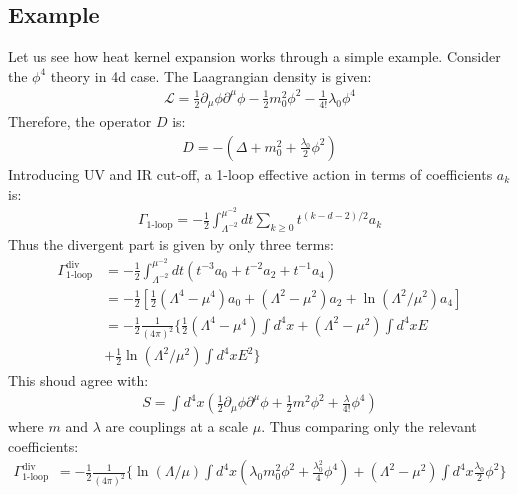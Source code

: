 \subsection{Example}
Let us see how heat kernel expansion works through a simple example. Consider the $\phi ^{4}$ theory in 4d case. The Laagrangian density is given:
\begin{align}
    \mathcal{L} = \frac{1}{2} \partial_{\mu} \phi \partial ^{\mu} \phi - \frac{1}{2}m_{0}^{2} \phi^{2} -\frac{1}{4!} \lambda _{0} \phi^4
\end{align}
Therefore, the operator $D$ is:
\begin{align}
    D = -(\Delta + m_{0}^{2} + \frac{\lambda_{0}}{2}\phi ^{2})
\end{align}
Introducing UV and IR cut-off, a 1-loop effective action in terms of coefficients $a_{k}$ is:
\begin{align}
    \Gamma _{\text{1-loop}} = -\frac{1}{2} \int _{\Lambda ^{-2}}^{\mu ^{-2}} dt \sum _{k\ge 0} t^{(k-d-2)/2}a_{k} 
\end{align}
Thus the divergent part is given by only three terms:
\begin{align}
    \Gamma_{\text{1-loop}}^{\text{div}} &= -\frac{1}{2}  \int _{\Lambda ^{-2}}^{\mu ^{-2}} dt (t^{-3} a_{0} + t^{-2} a_{2} + t^{-1} a_{4}) \nonumber \\
    & = -\frac{1}{2} [\frac{1}{2} (\Lambda ^{4} -\mu ^{4}) a_{0} + (\Lambda ^{2} - \mu ^{2}) a_{2} + \ln (\Lambda ^{2}/\mu ^{2}) a_{4}] \nonumber \\
    &= -\frac{1}{2} \frac{1}{(4\pi)^{2}} \lbrace \frac{1}{2} (\Lambda ^{4} - \mu ^{4}) \int d^{4}x + (\Lambda ^{2} - \mu ^{2}) \int d^{4}x E \nonumber \\ 
    &+ \frac{1}{2} \ln (\Lambda ^{2} / \mu ^{2}) \int d^{4}x E^{2} \rbrace 
\end{align}
This shoud agree with:
\begin{align}
    S = \int d^{4}x (\frac{1}{2}\partial _{\mu} \phi \partial ^{\mu} \phi + \frac{1}{2} m^{2} \phi ^{2} + \frac{\lambda}{4!}\phi^{4})
\end{align}
where $m$ and $\lambda$ are couplings at a scale $\mu$.
Thus comparing only the relevant coefficients:
\begin{align}
    \Gamma_{\text{1-loop}}^{\text{div}} &= -\frac{1}{2} \frac{1}{(4\pi)^{2}}  \lbrace \ln(\Lambda/\mu) \int d^{4}x (\lambda _{0} m_{0}^{2} \phi^{2} + \frac{\lambda_{0}^{2}}{4} \phi^{4})  + (\Lambda^{2} - \mu ^{2}) \int d^{4}x\frac{\lambda _{0}}{2} \phi^{2} \rbrace
\end{align}
